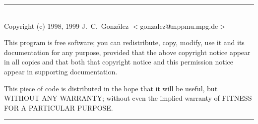 \vskip 4cm                                          %
\hfill\parbox[b]{0.9\linewidth}{
\hrule\mbox{}\\

Copyright (c) 1998, 1999  J.~C.~Gonz{\'{a}}lez 
$<$gonzalez@mppmu.mpg.de$>$\\

\par

This program is free software; you can redistribute, copy, modify, use
it and its documentation for any purpose, provided that the above
copyright notice appear in all copies and that both that copyright
notice and this permission notice appear in supporting
documentation.\\

\par

This piece of code is distributed in the hope that it will be useful,
but WITHOUT ANY WARRANTY; without even the implied warranty of FITNESS
FOR A PARTICULAR PURPOSE.\\

\par
\hrule
}